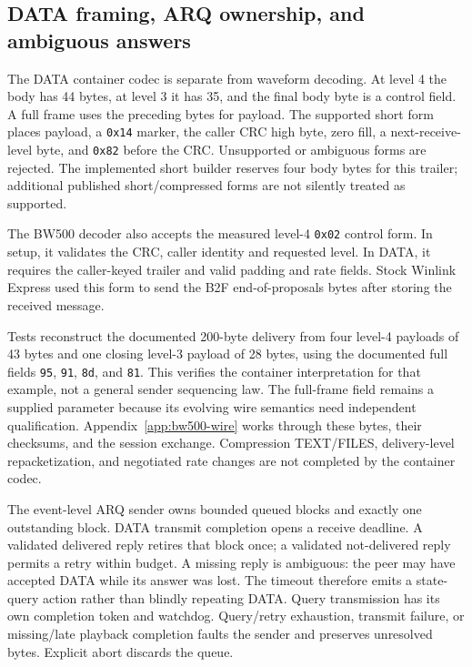 \subsection{DATA framing, ARQ ownership, and ambiguous answers}
The DATA container codec is separate from waveform decoding. At level 4 the
body has 44 bytes, at level 3 it has 35, and the final body byte is a control
field. A full frame uses the preceding bytes for payload. The supported short
form places payload, a \texttt{0x14} marker, the caller CRC high byte, zero
fill, a next-receive-level byte, and \texttt{0x82} before the CRC. Unsupported
or ambiguous forms are rejected. The implemented short builder reserves four
body bytes for this trailer; additional published short/compressed forms are
not silently treated as supported.

The BW500 decoder also accepts the measured level-4 \texttt{0x02}
control form. In setup, it validates the CRC, caller identity and
requested level. In DATA, it requires the caller-keyed trailer and valid
padding and rate fields. Stock Winlink Express used this form to send
the B2F end-of-proposals bytes after storing the received message.

Tests reconstruct the documented 200-byte delivery from four level-4 payloads
of 43 bytes and one closing level-3 payload of 28 bytes, using the documented
full fields \texttt{95}, \texttt{91}, \texttt{8d}, and \texttt{81}. This verifies
the container interpretation for that example, not a general sender sequencing
law. The full-frame field remains a supplied parameter because its evolving
wire semantics need independent qualification. Appendix~\ref{app:bw500-wire}
works through these bytes, their checksums, and the session exchange.
Compression TEXT/FILES,
delivery-level repacketization, and negotiated rate changes are not completed
by the container codec.

The event-level ARQ sender owns bounded queued blocks and exactly one
outstanding block. DATA transmit completion opens a receive deadline. A
validated delivered reply retires that block once; a validated not-delivered
reply permits a retry within budget. A missing reply is ambiguous: the peer
may have accepted DATA while its answer was lost. The timeout therefore emits
a state-query action rather than blindly repeating DATA. Query transmission
has its own completion token and watchdog. Query/retry exhaustion, transmit
failure, or missing/late playback completion faults the sender and preserves
unresolved bytes. Explicit abort discards the queue.

